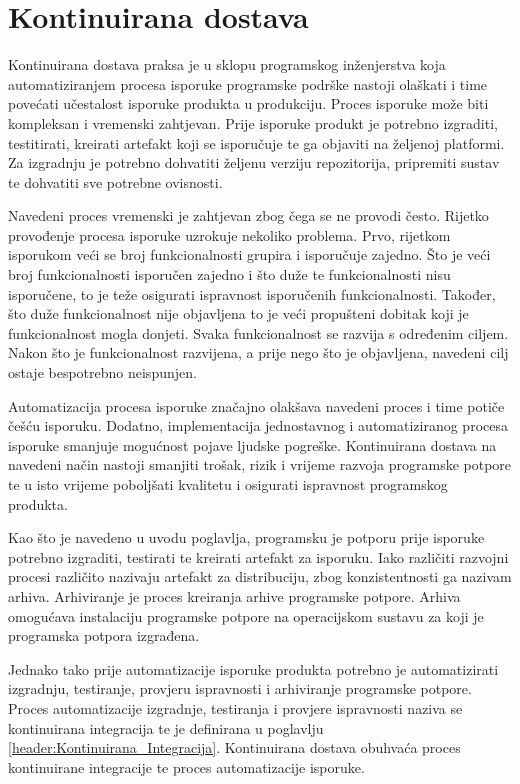 \documentclass[times, utf8, diplomski, numeric]{fer}
\begin{document}
\chapter{Kontinuirana dostava} \label{header:KontinuiranaDostava}

Kontinuirana dostava praksa je u sklopu programskog inženjerstva koja automatiziranjem procesa isporuke programske podrške nastoji olaškati i time povećati učestalost isporuke produkta u produkciju. Proces isporuke može biti kompleksan i vremenski zahtjevan. Prije isporuke produkt je potrebno izgraditi, testitirati, kreirati artefakt koji se isporučuje te ga objaviti na željenoj platformi. Za izgradnju je potrebno dohvatiti željenu verziju repozitorija, pripremiti sustav te dohvatiti sve potrebne ovisnosti.

Navedeni proces vremenski je zahtjevan zbog čega se ne provodi često. Rijetko provođenje procesa isporuke uzrokuje nekoliko problema. Prvo, rijetkom isporukom veći se broj funkcionalnosti grupira i isporučuje zajedno. Što je veći broj funkcionalnosti isporučen zajedno i što duže te funkcionalnosti nisu isporučene, to je teže osigurati ispravnost isporučenih funkcionalnosti. Također, što duže funkcionalnost nije objavljena to je veći propušteni dobitak koji je funkcionalnost mogla donjeti. Svaka funkcionalnost se razvija s određenim ciljem. Nakon što je funkcionalnost razvijena, a prije nego što je objavljena, navedeni cilj ostaje bespotrebno neispunjen.

Automatizacija procesa isporuke značajno olakšava navedeni proces i time potiče češću isporuku. Dodatno, implementacija jednostavnog i automatiziranog procesa isporuke smanjuje mogućnost pojave ljudske pogreške. Kontinuirana dostava na navedeni način nastoji smanjiti trošak, rizik i vrijeme razvoja programske potpore te u isto vrijeme poboljšati kvalitetu i osigurati ispravnost programskog produkta\citep{wiki:ContinuousDelivery}.

Kao što je navedeno u uvodu poglavlja, programsku je potporu prije isporuke potrebno izgraditi, testirati te kreirati artefakt za isporuku. Iako različiti razvojni procesi različito nazivaju artefakt za distribuciju, zbog konzistentnosti ga nazivam arhiva. Arhiviranje je proces kreiranja arhive programske potpore. Arhiva omogućava instalaciju programske potpore na operacijskom sustavu za koji je programska potpora izgrađena.

Jednako tako prije automatizacije isporuke produkta potrebno je automatizirati izgradnju, testiranje, provjeru ispravnosti i arhiviranje programske potpore. Proces automatizacije izgradnje, testiranja i provjere ispravnosti naziva se kontinuirana integracija te je definirana u poglavlju \ref{header:Kontinuirana_Integracija}. Kontinuirana dostava obuhvaća proces kontinuirane integracije te proces automatizacije isporuke.
\end{document}
